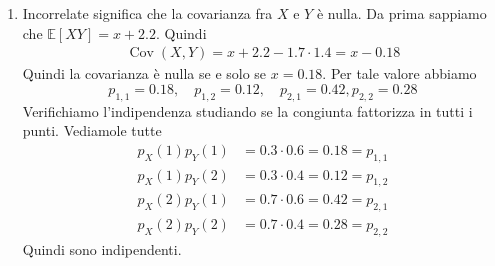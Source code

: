 \documentclass[a4paper]{article}
\begin{document}
\begin{snippetsolution}{}
\begin{enumerate}
            in funzione di una sola incognita \(x\).
            Scriviamo
            \begin{align*}
                x \triangleq p_{1,1} \\
                p_{1,1} + p_{1,2} &= 0.3 \rightarrow p_{1,2} = 0.3 - x \\
                p_{1,1} + p_{2,1} &= 0.6 \rightarrow p_{2,1} = 0.6 - x \\
                p_{1,1} + p_{2,1} + p_{1,2} + p_{2,2} &= 1 \rightarrow p_{2,2} = 0.1 + x
            \end{align*}
            Quindi abbiamo pure il vincolo che \(0 \leq x \leq 0.3\).
            Allora sostituendo otteniamo
            \begin{align*}
                \mathbb E[XY] &= x + 2(0.3 - x + 0.6 - x)
                + 4(0.1 + x) \\
                &= x + 2.2
            \end{align*}
            Quindi i valori di massimo
            e minimo avvengono per \(x=0.3\)
            e \(x=0\) rispettivamente, cioè per il massimo vale
            \[
                p_{1,1} = 0.3, \quad p_{1,2} = 0, \quad p_{2,1} = 0.3, p_{2,2} = 0.4
            \]
            e per il minimo
            \[
                p_{1,1} = 0, \quad p_{1,2} = 0.3, \quad p_{2,1} = 0.6, p_{2,2} = 0.1
            \]
        \item Incorrelate significa che la covarianza fra \(X\) e \(Y\) è nulla. Da prima sappiamo che
            \(\mathbb E[XY] = x + 2.2\). Quindi
            \begin{align*}
                \operatorname{Cov}(X,Y) = x + 2.2 - 1.7 \cdot 1.4
                = x - 0.18
            \end{align*}
            Quindi la covarianza è nulla se e solo se \(x=0.18\).
            Per tale valore abbiamo
            \[
                p_{1,1} = 0.18, \quad p_{1,2} = 0.12, \quad p_{2,1} = 0.42, p_{2,2} = 0.28
            \]
            Verifichiamo l'indipendenza studiando se la congiunta fattorizza in tutti i punti.
            Vediamole tutte
            \begin{align*}
                p_X(1)p_Y(1) &= 0.3 \cdot 0.6 = 0.18 = p_{1,1} \\
                p_X(1)p_Y(2) &= 0.3 \cdot 0.4 = 0.12 = p_{1,2} \\
                p_X(2)p_Y(1) &= 0.7 \cdot 0.6 = 0.42 = p_{2,1} \\
                p_X(2)p_Y(2) &= 0.7 \cdot 0.4 = 0.28 = p_{2,2}
            \end{align*}
            Quindi sono indipendenti.
    \end{enumerate}
\end{snippetsolution}
\end{document}
